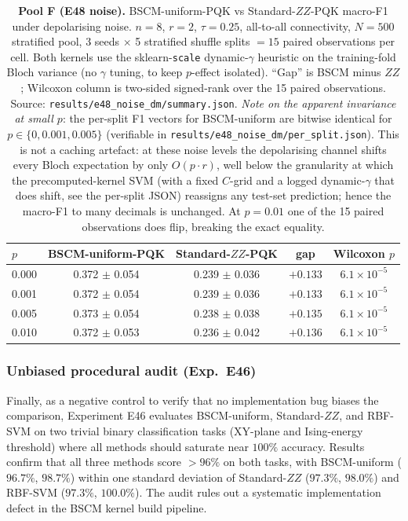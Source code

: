 \documentclass[pdflatex,sn-mathphys]{sn-jnl}
\theoremstyle{plain}
\theoremstyle{remark}
\theoremstyle{definition}
\begin{document}
\begin{table}[htbp]
\caption{\textbf{Pool F (E48 noise).} BSCM-uniform-PQK vs Standard-$ZZ$-PQK macro-F1 under depolarising noise.  $n=8$, $r=2$, $\tau=0.25$, all-to-all connectivity, $N=500$ stratified pool, 3 seeds $\times$ 5 stratified shuffle splits $=15$ paired observations per cell.  Both kernels use the sklearn-\texttt{scale} dynamic-$\gamma$ heuristic on the training-fold Bloch variance (no $\gamma$ tuning, to keep $p$-effect isolated).  ``Gap'' is BSCM minus $ZZ$; Wilcoxon column is two-sided signed-rank over the 15 paired observations.  Source: \texttt{results/e48\_noise\_dm/summary.json}.  \emph{Note on the apparent invariance at small $p$}: the per-split F1 vectors for BSCM-uniform are bitwise identical for $p\in\{0, 0.001, 0.005\}$ (verifiable in \texttt{results/e48\_noise\_dm/per\_split.json}).  This is not a caching artefact: at these noise levels the depolarising channel shifts every Bloch expectation by only $O(p \cdot r)$, well below the granularity at which the precomputed-kernel SVM (with a fixed $C$-grid and a logged dynamic-$\gamma$ that does shift, see the per-split JSON) reassigns any test-set prediction; hence the macro-F1 to many decimals is unchanged.  At $p=0.01$ one of the 15 paired observations does flip, breaking the exact equality.}
\label{tab:e48}
\begin{tabular}{lcccc}
\toprule
$p$ & BSCM-uniform-PQK & Standard-$ZZ$-PQK & gap & Wilcoxon $p$ \\
\midrule
0.000 & 0.372 $\pm$ 0.054 & 0.239 $\pm$ 0.036 & $+0.133$ & $6.1\!\times\!10^{-5}$ \\
0.001 & 0.372 $\pm$ 0.054 & 0.239 $\pm$ 0.036 & $+0.133$ & $6.1\!\times\!10^{-5}$ \\
0.005 & 0.373 $\pm$ 0.054 & 0.238 $\pm$ 0.038 & $+0.135$ & $6.1\!\times\!10^{-5}$ \\
0.010 & 0.372 $\pm$ 0.053 & 0.236 $\pm$ 0.042 & $+0.136$ & $6.1\!\times\!10^{-5}$ \\
\bottomrule
\end{tabular}
\end{table}

\subsubsection{Unbiased procedural audit (Exp.\ E46)}
Finally, as a negative control to verify that no implementation bug biases the comparison, Experiment E46 evaluates BSCM-uniform, Standard-$ZZ$, and RBF-SVM on two trivial binary classification tasks (XY-plane and Ising-energy threshold) where all methods should saturate near $100\%$ accuracy. Results confirm that all three methods score $>96\%$ on both tasks, with BSCM-uniform ($96.7\%$, $98.7\%$) within one standard deviation of Standard-$ZZ$ ($97.3\%$, $98.0\%$) and RBF-SVM ($97.3\%$, $100.0\%$). The audit rules out a systematic implementation defect in the BSCM kernel build pipeline.
\end{document}
